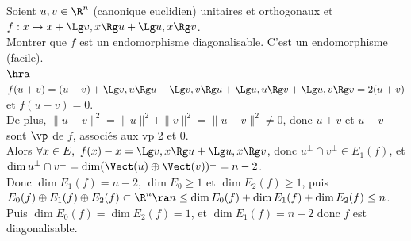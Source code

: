 \documentclass[11pt]{article}
\begin{document}
\begin{exercice}{}{}
    Soient $u,v\in\R^n$ (canonique euclidien) unitaires et orthogonaux et $f:x\mapsto x+\Lg v,x \Rg u + \Lg u,x\Rg v$.\\
    Montrer que $f$ est un endomorphisme diagonalisable.
    \tcblower
    C'est un endomorphisme (facile).\\
    $\hra$ $f(u+v)=(u+v)+\Lg v,u\Rg u + \Lg v, v \Rg u + \Lg u, u\Rg v + \Lg u, v\Rg v = 2(u+v)$ et $f(u-v)=0$.\\
    De plus, $\|u+v\|^2=\|u\|^2+\|v\|^2=\|u-v\|^2\neq0$, donc $u+v$ et $u-v$ sont $\vp$ de $f$, associés aux vp 2 et 0.\\
    Alors $\forall x \in E, ~ f(x)-x = \Lg v,x\Rg u + \Lg u,x \Rg v$, donc $u^\bot \cap v^\bot \in E_1(f)$, et $\dim u^\bot \cap v^\bot = \dim(\Vect(u)\oplus \Vect(v))^\bot = n-2$.\\
    Donc $\dim E_1(f)=n-2$, $\dim E_0 \geq 1$ et $\dim E_2(f) \geq 1$, puis $E_0(f)\oplus E_1(f) \oplus E_2(f)\subset \R^n \ra n \leq \dim E_0(f) + \dim E_1(f) + \dim E_2(f) \leq n$.
    Puis $\dim E_0(f) = \dim E_2(f) = 1$, et $\dim E_1(f)=n-2$ donc $f$ est diagonalisable.
\end{exercice}
\end{document}
